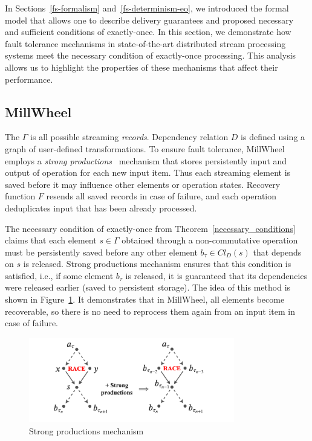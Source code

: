 In Sections~\ref{fs-formalism} and~\ref{fs-determinism-eo}, we introduced the formal model that allows one to describe delivery guarantees and proposed necessary and sufficient conditions of exactly-once. In this section, we demonstrate how fault tolerance mechanisms in state-of-the-art distributed stream processing systems meet the necessary condition of exactly-once processing. This analysis allows us to highlight the properties of these mechanisms that affect their performance.

\subsection{MillWheel}

 The $\Gamma$ is all possible streaming {\em records}. Dependency relation $D$ is defined using a graph of user-defined transformations. 
 To ensure fault tolerance,   MillWheel employs a {\em strong productions}~\cite{Akidau:2013:MFS:2536222.2536229}   mechanism that stores persistently input and output of operation for each new input item.
 Thus each streaming element is saved before it may influence other elements or operation states. 
 Recovery function $F$ resends all saved records in case of failure, and each operation deduplicates input that has been already processed.

The necessary condition of exactly-once from Theorem~\ref{necessary_conditions} claims that each element $s \in \Gamma$ obtained through a non-commutative operation must be persistently saved before any other element $b_{\tau} \in Cl_D(s)$ that depends on $s$ is released. Strong productions mechanism ensures that this condition is satisfied, i.e., if some element $b_\tau$ is released, it is guaranteed that its dependencies were released earlier (saved to persistent storage). The idea of this method is shown in Figure~\ref{millwheel}. It demonstrates that in MillWheel, all elements become recoverable, so there is no need to reprocess them again from an input item in case of failure. 

\begin{figure}[t]
  \centering
  \includegraphics[width=0.8\textwidth]{Chapters/DeliveryGuarantees/pics/millwheel.png}
  \caption{Strong productions mechanism}
  \label{millwheel}
\end{figure}

